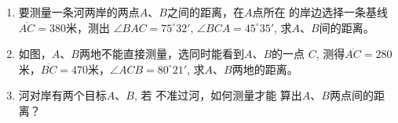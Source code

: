 \begin{ex}
\begin{enumerate}
    \item 要测量一条河两岸的两点$A$、$B$之间的距离，在$A$点所在
    的岸边选择一条基线$\overline{AC}=380$米，测出
    $\angle BAC=75^{\circ}32'$, $\angle BCA=45^{\circ}35'$, 
    求$A$、$B$间的距离。
    \item 如图，$A$、$B$两地不能直接测量，选同时能看到$A$、$B$的一点
    $C$, 测得$\overline{AC}=280$米，$\overline{BC}=470$米，$\angle ACB=80^{\circ}21'$, 
    求$A$、$B$两地的距离。
    \item 河对岸有两个目标$A$、$B$, 若
    不准过河，如何测量才能
    算出$A$、$B$两点间的距离？
\end{enumerate}
\end{ex}



